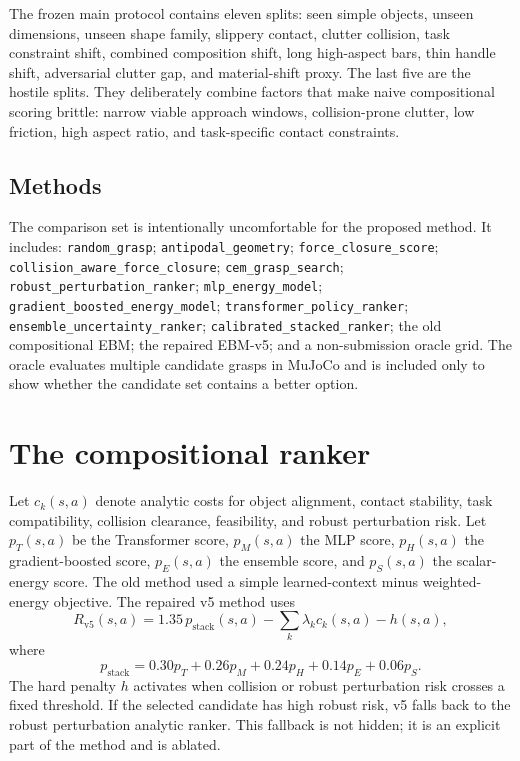 \documentclass{article}
\newcommand{\method}{EBM-v5}
\begin{document}
The frozen main protocol contains eleven splits:
seen simple objects, unseen dimensions, unseen shape family, slippery contact, clutter collision, task constraint shift, combined composition shift, long high-aspect bars, thin handle shift, adversarial clutter gap, and material-shift proxy.
The last five are the hostile splits.
They deliberately combine factors that make naive compositional scoring brittle: narrow viable approach windows, collision-prone clutter, low friction, high aspect ratio, and task-specific contact constraints.

\subsection{Methods}

The comparison set is intentionally uncomfortable for the proposed method.
It includes:
\texttt{random\_grasp};
\texttt{antipodal\_geometry};
\texttt{force\_closure\_score};
\texttt{collision\_aware\_force\_closure};
\texttt{cem\_grasp\_search};
\texttt{robust\_perturbation\_ranker};
\texttt{mlp\_energy\_model};
\texttt{gradient\_boosted\_energy\_model};
\texttt{transformer\_policy\_ranker};
\texttt{ensemble\_uncertainty\_ranker};
\texttt{calibrated\_stacked\_ranker};
the old compositional EBM;
the repaired \method{};
and a non-submission oracle grid.
The oracle evaluates multiple candidate grasps in MuJoCo and is included only to show whether the candidate set contains a better option.

\section{The compositional ranker}

Let $c_k(s,a)$ denote analytic costs for object alignment, contact stability, task compatibility, collision clearance, feasibility, and robust perturbation risk.
Let $p_T(s,a)$ be the Transformer score, $p_M(s,a)$ the MLP score, $p_H(s,a)$ the gradient-boosted score, $p_E(s,a)$ the ensemble score, and $p_S(s,a)$ the scalar-energy score.
The old method used a simple learned-context minus weighted-energy objective.
The repaired v5 method uses
\begin{equation}
  R_{\text{v5}}(s,a)
  =
  1.35\,p_{\text{stack}}(s,a)
  - \sum_k \lambda_k c_k(s,a)
  - h(s,a),
\end{equation}
where
\begin{equation}
  p_{\text{stack}} =
  0.30p_T + 0.26p_M + 0.24p_H + 0.14p_E + 0.06p_S.
\end{equation}
The hard penalty $h$ activates when collision or robust perturbation risk crosses a fixed threshold.
If the selected candidate has high robust risk, v5 falls back to the robust perturbation analytic ranker.
This fallback is not hidden; it is an explicit part of the method and is ablated.
\end{document}
